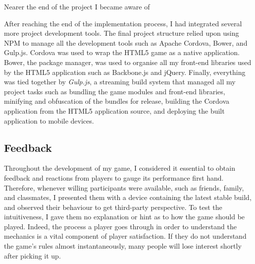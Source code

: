 \documentclass[final]{cmpreport}
\begin{document}
Nearer the end of the project I became aware of 

After reaching the end of the implementation process, I had integrated several more project development tools. The final project structure relied upon using NPM to manage all the development tools such as Apache Cordova, Bower, and Gulp.js. Cordova was used to wrap the HTML5 game as a native application. Bower, the package manager, was used to organise all my front-end libraries used by the HTML5 application such as Backbone.js and jQuery. Finally, everything was tied together by \textit{Gulp.js}, a streaming build system that managed all my project tasks such as bundling the game modules and front-end libraries, minifying and obfuscation of the bundles for release, building the Cordova application from the HTML5 application source, and deploying the built application to mobile devices.


\subsection{Feedback}
Throughout the development of my game, I considered it essential to obtain feedback and reactions from players to gauge its performance first hand. Therefore, whenever willing participants were available, such as friends, family, and classmates, I presented them with a device containing the latest stable build, and observed their behaviour to get third-party perspective. To test the intuitiveness, I gave them no explanation or hint as to how the game should be played. Indeed, the process a player goes through in order to understand the mechanics is a vital component of player satisfaction. If they do not understand the game's rules almost instantaneously, many people will lose interest shortly after picking it up.
\end{document}
